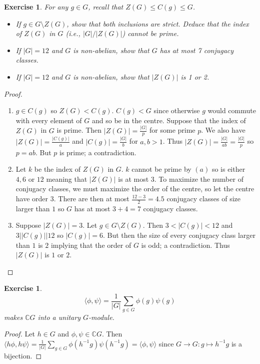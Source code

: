 \documentclass{article}
\newtheorem{exercise}[theorem]{Exercise}
\begin{document}
\begin{exercise}
For any \( g \in G \), recall that \( Z(G) \leqslant C(g) \leqslant G \).
    \begin{itemize}
        \item[(a)] If \( g \in G \setminus Z(G) \), show that both inclusions are strict. Deduce that the index of \( Z(G) \) in \( G \) (i.e., \( |G|/|Z(G)| \)) cannot be prime.
        \item[(b)] If \( |G| = 12 \) and \( G \) is non-abelian, show that \( G \) has at most 7 conjugacy classes.
        \item[(c)] If \( |G| = 12 \) and \( G \) is non-abelian, show that \( |Z(G)| \) is 1 or 2.
    \end{itemize}
\end{exercise}
\begin{proof}
\begin{enumerate}
    \item[(a)] $g\in C(g)$ so $Z(G)<C(g)$. $C(g)<G$ since otherwise $g$ would commute with every element of $G$ and so be in the centre. Suppose that the index of $Z(G)$ in $G$ is prime. Then $|Z(G)|=\frac{|G|}{p}$ for some prime $p$. We also have $|Z(G)|=\frac{|C(g)|}{a}$ and $|C(g)|=\frac{|G|}{b}$ for $a,b>1$. Thus $|Z(G)|=\frac{|G|}{ab}=\frac{|G|}{p}$ so $p=ab$. But $p$ is prime; a contradiction.
    \item[(b)] Let $k$ be the index of $Z(G)$ in $G$. $k$ cannot be prime by $(a)$ so is either $4,6$ or $12$ meaning that $|Z(G)|$ is at most $3$. To maximize the number of conjugacy classes, we must maximize the order of the centre, so let the centre have order $3$. There are then at most $\frac{12-3}{2}=4.5$ conjugacy classes of size larger than $1$ so $G$ has at most $3+4=7$ conjugacy classes.
    \item[(c)] Suppose $|Z(G)|=3$. Let $g\in G \setminus Z(G)$. Then $3<|C(g)|<12$ and $3| |C(g)| | 12$ so $|C(g)|=6$. But then the size of every conjugacy class larger than $1$ is $2$ implying that the order of $G$ is odd; a contradiction. Thus $|Z(G)|$ is $1$ or $2$.
\end{enumerate}
\end{proof}
    

\begin{exercise}
\[
\langle \phi, \psi \rangle = \frac{1}{|G|} \sum_{g \in G} \phi(g) \psi(g)
\]
makes \( \mathbb{C}G \) into a unitary \( G \)-module.
\end{exercise}
\begin{proof}
Let $h\in G$ and $\phi,\psi\in\mathbb{C}G$. Then $\langle h\phi,h\psi\rangle=\frac{1}{|G|}\sum_{g\in G}\phi(h^{-1}g)\psi(h^{-1}g)=\langle\phi,\psi\rangle$ since $G\to G:g\mapsto h^{-1}g$ is a bijection.
\end{proof}
\end{document}
